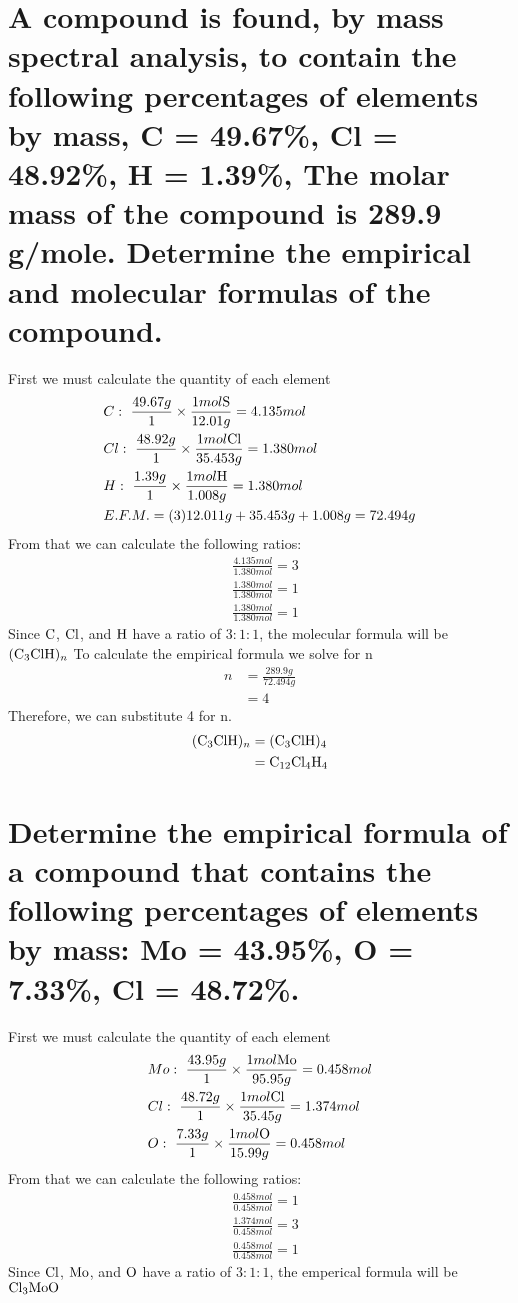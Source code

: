 \documentclass{scrartcl}
\begin{document}
\section{A compound is found, by mass spectral analysis, to contain the following percentages of elements by mass, C = 49.67\%, Cl = 48.92\%, H = 1.39\%, The molar mass of the compound is 289.9 g/mole. Determine the empirical and molecular formulas of the compound.}
\label{sec:org057611d}
First we must calculate the quantity of each element
\begin{align*}
&C:\ \frac{49.67g}{1}\times\frac{1mol\ce{S}}{12.01g}=4.135mol\\
&Cl:\ \frac{48.92g}{1}\times\frac{1mol\ce{Cl}}{35.453g}=1.380mol\\
&H:\ \frac{1.39g}{1}\times\frac{1mol\ce{H}}{1.008g}=1.380mol\\
&E.F.M.=(3)12.011g+35.453g+1.008g=72.494g
\end{align*}
From that we can calculate the following ratios:
\begin{align*}
&\frac{4.135mol}{1.380mol}=3\\
&\frac{1.380mol}{1.380mol}=1\\
&\frac{1.380mol}{1.380mol}=1
\end{align*}
Since \(\ce{C}\), \(\ce{Cl}\), and  \(\ce{H}\) have a ratio of \(3:1:1\), the molecular formula will be \(\ce{(C3ClH)_n}\) To calculate the empirical formula we solve for n
\begin{align*}
n&=\frac{289.9g}{72.494g}\\
&=4
\end{align*}
Therefore, we can substitute 4 for n.
\begin{align*}
\ce{(C3ClH)_n}&=\ce{(C3ClH)4}\\
&=\ce{C12Cl4H4}
\end{align*}

\section{Determine the empirical formula of a compound that contains the following percentages of elements by mass: Mo = 43.95\%, O = 7.33\%, Cl = 48.72\%.}
\label{sec:org67896a1}
First we must calculate the quantity of each element
\begin{align*}
&Mo:\ \frac{43.95g}{1}\times\frac{1mol\ce{Mo}}{95.95g}=0.458mol\\
&Cl:\ \frac{48.72g}{1}\times\frac{1mol\ce{Cl}}{35.45g}=1.374mol\\
&O:\ \frac{7.33g}{1}\times\frac{1mol\ce{O}}{15.99g}=0.458mol
\end{align*}
From that we can calculate the following ratios:
\begin{align*}
&\frac{0.458mol}{0.458mol}=1\\
&\frac{1.374mol}{0.458mol}=3\\
&\frac{0.458mol}{0.458mol}=1
\end{align*}
 Since \(\ce{Cl}\), \(\ce{Mo}\), and  \(\ce{O}\) have a ratio of \(3:1:1\), the
emperical formula will be  \(\ce{Cl3MoO}\)
\end{document}
